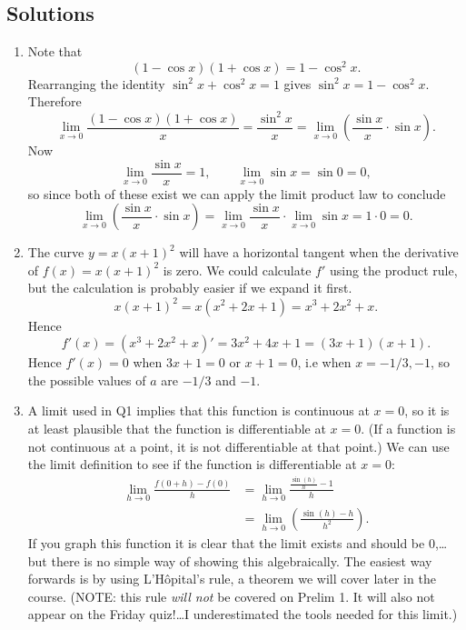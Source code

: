 \documentclass[12pt,a4paper]{article}
\newcommand{\rar}{\rightarrow}
\begin{document}
\subsection*{Solutions}
\begin{enumerate}
	\item Note that
\[
	(1 - \cos x)(1 + \cos x) = 1 - \cos^2 x.
\]
Rearranging the identity $\sin^2 x + \cos^2 x = 1$ gives $\sin^2 x = 1 - \cos^2 x$. Therefore
\[
	\lim_{x \rar 0}\frac{(1 - \cos x)(1 + \cos x)}{x} = \frac{\sin^2x}{x} = \lim_{x \rar 0} \left( \frac{\sin x}{x} \cdot \sin x \right).
\]
Now
\[
	\lim_{x \rar 0}\frac{\sin x}{x} = 1, \qquad \lim_{x \rar 0}\sin x = \sin 0 = 0,
\]
so since both of these exist we can apply the limit product law to conclude
\[
	\lim_{x \rar 0}\left( \frac{\sin x}{x} \cdot \sin x \right) = \lim_{x \rar 0}\frac{\sin x}{x} \cdot \lim_{x \rar 0} \sin x = 1 \cdot 0 = 0.
\]
	\item The curve $y = x(x+1)^2$ will have a horizontal tangent when the derivative of $f(x) = x(x+1)^2$ is zero. We could calculate $f'$ using the product rule, but the calculation is probably easier if we expand it first.
\[
	x(x+1)^2 = x(x^2 + 2x + 1) = x^3 + 2x^2 + x.
\]
Hence
\[
	f'(x) = (x^3 + 2x^2 + x)' = 3x^2 + 4x + 1 = (3x + 1)(x+1).
\]
Hence $f'(x) = 0$ when $3x + 1 = 0$ or $x + 1 = 0$, i.e when $x = -1/3, -1$, so the possible values of $a$ are $-1/3$ and $-1$.
	\item A limit used in Q1 implies that this function is continuous at $x = 0$, so it is at least plausible that the function is differentiable at $x = 0$. (If a function is not continuous at a point, it is not differentiable at that point.) We can use the limit definition to see if the function is differentiable at $x = 0$:
\begin{equation*}
\begin{split}
	\lim_{h \rar 0}\frac{f(0 + h) - f(0)}{h} &= \lim_{h \rar 0}\frac{\frac{\sin(h)}{h} - 1}{h}  \\
		&= \lim_{h \rar 0}\left( \frac{\sin(h) - h}{h^2} \right).
\end{split}
\end{equation*}
If you graph this function it is clear that the limit exists and should be 0,\ldots but there is no simple way of showing this algebraically. The easiest way forwards is by using L'H\^opital's rule, a theorem we will cover later in the course. (NOTE: this rule \emph{will not} be covered on Prelim 1. It will also not appear on the Friday quiz!\ldots I underestimated the tools needed for this limit.)


\end{enumerate}
\end{document}
